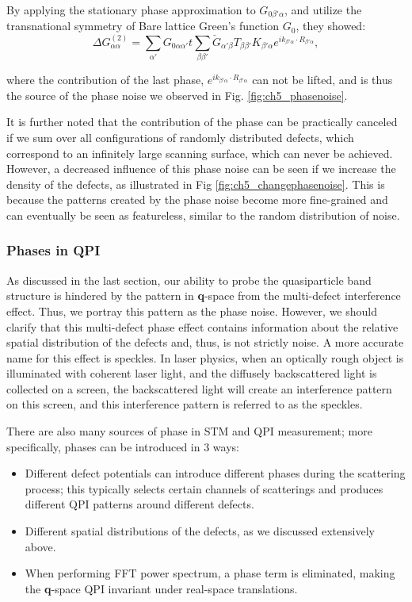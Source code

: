 \noindent By applying the stationary phase approximation \cite{lounisTheoryRealSpace2011} to $G_{0\beta'\alpha}$, and utilize the transnational symmetry of Bare lattice Green's function $G_0$, they showed:
\begin{equation}
	\label{eq.539}
	\Delta G^{(2)}_{\alpha\alpha}=\sum_{\alpha'}G_{0\alpha\alpha'}t\sum_{\beta\beta'}\check{G}_{\alpha'\beta}T_{\beta\beta'}K_{\beta'\alpha}e^{ik_{\beta'\alpha}\cdot R_{\beta'\alpha}},
\end{equation}

\noindent where the contribution of the last phase, $e^{ik_{\beta'\alpha}\cdot R_{\beta'\alpha}}$ can not be lifted, and is thus the source of the phase noise we observed in Fig. \ref{fig:ch5_phasenoise}. 

It is further noted that the contribution of the phase can be practically canceled if we sum over all configurations of randomly distributed defects, which correspond to an infinitely large scanning surface, which can never be achieved. However, a decreased influence of this phase noise can be seen if we increase the density of the defects, as illustrated in Fig \ref{fig:ch5_changephasenoise}. This is because the patterns created by the phase noise become more fine-grained and can eventually be seen as featureless, similar to the random distribution of noise.  

\subsubsection{Phases in QPI}
As discussed in the last section, our ability to probe the quasiparticle band structure is hindered by the pattern in \textbf{q}-space from the multi-defect interference effect. Thus, we portray this pattern as the phase noise. However, we should clarify that this multi-defect phase effect contains information about the relative spatial distribution of the defects and, thus, is not strictly noise. A more accurate name for this effect is speckles. In laser physics, when an optically rough object is illuminated with coherent laser light, and the diffusely backscattered light is collected on a screen, the backscattered light will create an interference pattern on this screen, and this interference pattern is referred to as the speckles\cite{ReviewLaserSpeckle}.

There are also many sources of phase in \ac{STM} and \ac{QPI} measurement; more specifically, phases can be introduced in 3 ways: 
\begin{itemize}
	\item Different defect potentials can introduce different phases during the scattering process; this typically selects certain channels of scatterings and produces different QPI patterns around different defects. \cite{chenAtomicallyResolvedDefectEngineering2024}
	\item Different spatial distributions of the defects, as we discussed extensively above. 
	\item When performing FFT power spectrum, a phase term is eliminated, making the \textbf{q}-space \ac{QPI} invariant under real-space translations.
\end{itemize}

